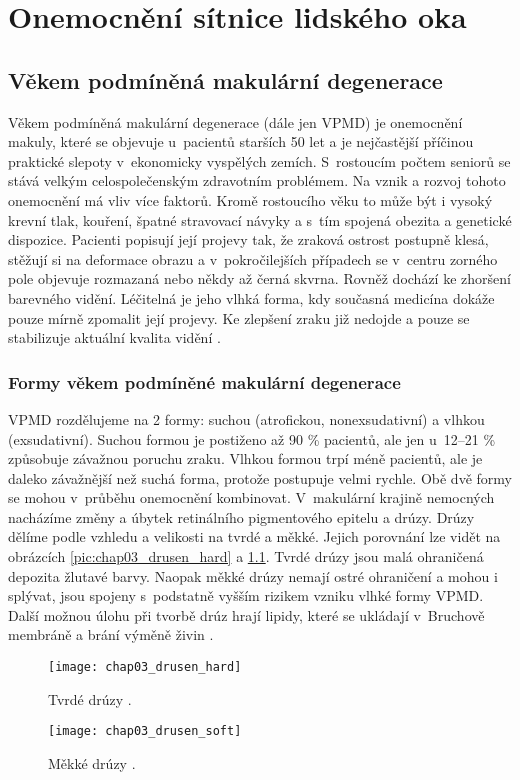 \chapter{Onemocnění sítnice lidského oka}
\label{ch:nemoci}

\section{Věkem podmíněná makulární degenerace}
Věkem podmíněná makulární degenerace (dále jen VPMD) je onemocnění makuly, které se objevuje u~pacientů starších 50 let a je nejčastější příčinou praktické slepoty v~ekonomicky vyspělých zemích. S~rostoucím počtem seniorů se stává velkým celospolečenským zdravotním problémem. Na vznik a rozvoj tohoto onemocnění má vliv více faktorů. Kromě rostoucího věku to může být i vysoký krevní tlak, kouření, špatné stravovací návyky a s~tím spojená obezita a genetické dispozice. Pacienti popisují její projevy tak, že zraková ostrost postupně klesá, stěžují si na deformace obrazu a v~pokročilejších případech se v~centru zorného pole objevuje rozmazaná nebo někdy až černá skvrna. Rovněž dochází ke zhoršení barevného vidění. Léčitelná je jeho vlhká forma, kdy současná medicína dokáže pouze mírně zpomalit její projevy. Ke zlepšení zraku již nedojde a pouze se stabilizuje aktuální kvalita vidění \cite{Atlas}.

\subsection*{Formy věkem podmíněné makulární degenerace}
VPMD rozdělujeme na 2 formy: suchou (atrofickou, nonexsudativní) a vlhkou (exsudativní). Suchou formou je postiženo až 90 \% pacientů, ale jen u~12--21 \% způsobuje závažnou poruchu zraku. Vlhkou formou trpí méně pacientů, ale je daleko závažnější než suchá forma, protože postupuje velmi rychle. Obě dvě formy se mohou v~průběhu onemocnění kombinovat. V~makulární krajině nemocných nacházíme změny a úbytek retinálního pigmentového epitelu a drúzy. Drúzy dělíme podle vzhledu a velikosti na tvrdé a měkké. Jejich porovnání lze vidět na obrázcích \ref{pic:chap03_drusen_hard} a \ref{pic:chap03_drusen_soft}. Tvrdé drúzy jsou malá ohraničená depozita žlutavé barvy. Naopak měkké drúzy nemají ostré ohraničení a mohou i splývat, jsou spojeny s~podstatně vyšším rizikem vzniku vlhké formy VPMD. Další možnou úlohu při tvorbě drúz hrají lipidy, které se ukládají v~Bruchově membráně a brání výměně živin \cite{vpmd_kolar}.

\begin{figure}[h]
  \begin{minipage}[c]{0.47\textwidth}
    \texttt{[image: chap03\_drusen\_hard]}
    \caption{Tvrdé drúzy \cite{vpmd_kolar}.}
    \label{pic:chap03_drusen_hard}
  \end{minipage}
  \hfill
  \begin{minipage}[c]{0.47\textwidth}
    \texttt{[image: chap03\_drusen\_soft]}
    \caption{Měkké drúzy \cite{vpmd_kolar}.}
    \label{pic:chap03_drusen_soft}
  \end{minipage}
\end{figure}



